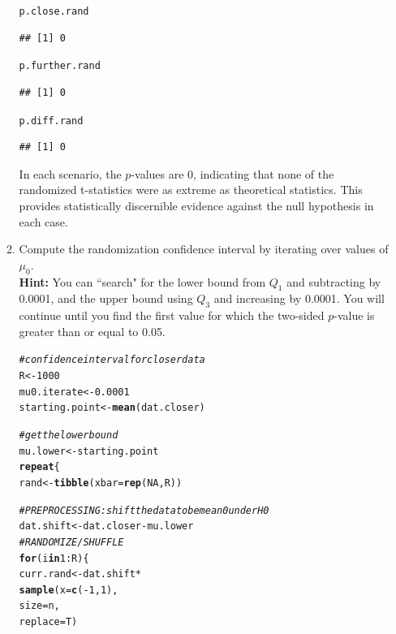 \documentclass{article}\usepackage[]{graphicx}\usepackage[]{xcolor}
\makeatletter
\newcommand{\hlnum}[1]{\textcolor[rgb]{0.686,0.059,0.569}{#1}}%
\newcommand{\hlcom}[1]{\textcolor[rgb]{0.678,0.584,0.686}{\textit{#1}}}%
\newcommand{\hlopt}[1]{\textcolor[rgb]{0,0,0}{#1}}%
\newcommand{\hldef}[1]{\textcolor[rgb]{0.345,0.345,0.345}{#1}}%
\newcommand{\hlkwa}[1]{\textcolor[rgb]{0.161,0.373,0.58}{\textbf{#1}}}%
\newcommand{\hlkwb}[1]{\textcolor[rgb]{0.69,0.353,0.396}{#1}}%
\newcommand{\hlkwc}[1]{\textcolor[rgb]{0.333,0.667,0.333}{#1}}%
\newcommand{\hlkwd}[1]{\textcolor[rgb]{0.737,0.353,0.396}{\textbf{#1}}}%
\newenvironment{kframe}{%
 \def\at@end@of@kframe{}%
 \ifinner\ifhmode%
  \def\at@end@of@kframe{\end{minipage}}%
  \begin{minipage}{\columnwidth}%
 \fi\fi%
 \def\FrameCommand##1{\hskip\@totalleftmargin \hskip-\fboxsep
 \colorbox{shadecolor}{##1}\hskip-\fboxsep
     \hskip-\linewidth \hskip-\@totalleftmargin \hskip\columnwidth}%
 \MakeFramed {\advance\hsize-\width
   \@totalleftmargin\z@ \linewidth\hsize
   \@setminipage}}%
 {\par\unskip\endMakeFramed%
 \at@end@of@kframe}
\newenvironment{knitrout}{}{} %
\makeatother
\begin{document}
\begin{enumerate}
\begin{enumerate}
\begin{knitrout}
\begin{kframe}
\begin{alltt}
\hldef{p.close.rand}
\end{alltt}
\begin{verbatim}
## [1] 0
\end{verbatim}
\begin{alltt}
\hldef{p.further.rand}
\end{alltt}
\begin{verbatim}
## [1] 0
\end{verbatim}
\begin{alltt}
\hldef{p.diff.rand}
\end{alltt}
\begin{verbatim}
## [1] 0
\end{verbatim}
\end{kframe}
\end{knitrout}
In each scenario, the $p$-values are 0, indicating that none of the randomized t-statistics were as extreme as theoretical statistics. This provides statistically discernible evidence against the null hypothesis in each case.
  \item Compute the randomization confidence interval by iterating over values of $\mu_0$.\\
  \textbf{Hint:} You can ``search" for the lower bound from $Q_1$ and subtracting by 0.0001, 
  and the upper bound using $Q_3$ and increasing by 0.0001. You will continue until you find 
  the first value for which the two-sided $p$-value is greater than or equal to 0.05.
\begin{knitrout}\scriptsize
{}\color{fgcolor}\begin{kframe}
\begin{alltt}
\hlcom{#confidence interval for closer data}
\hldef{R} \hlkwb{<-} \hlnum{1000}
\hldef{mu0.iterate} \hlkwb{<-} \hlnum{0.0001}
\hldef{starting.point} \hlkwb{<-} \hlkwd{mean}\hldef{(dat.closer)}

\hlcom{#get the lower bound}
\hldef{mu.lower} \hlkwb{<-} \hldef{starting.point}
\hlkwa{repeat}\hldef{\{}
\hldef{rand} \hlkwb{<-} \hlkwd{tibble}\hldef{(}\hlkwc{xbar} \hldef{=} \hlkwd{rep}\hldef{(}\hlnum{NA}\hldef{, R))}

\hlcom{# PREPROCESSING: shift the data to be mean 0 under H0}
\hldef{dat.shift} \hlkwb{<-} \hldef{dat.closer} \hlopt{-} \hldef{mu.lower}
\hlcom{# RANDOMIZE / SHUFFLE}
\hlkwa{for}\hldef{(i} \hlkwa{in} \hlnum{1}\hlopt{:}\hldef{R)\{}
  \hldef{curr.rand} \hlkwb{<-} \hldef{dat.shift} \hlopt{*}
    \hlkwd{sample}\hldef{(}\hlkwc{x} \hldef{=} \hlkwd{c}\hldef{(}\hlopt{-}\hlnum{1}\hldef{,} \hlnum{1}\hldef{),}
           \hlkwc{size} \hldef{= n,}
           \hlkwc{replace} \hldef{= T)}


\end{alltt}
\end{kframe}
\end{knitrout}
\end{enumerate}
\end{enumerate}
\end{document}
